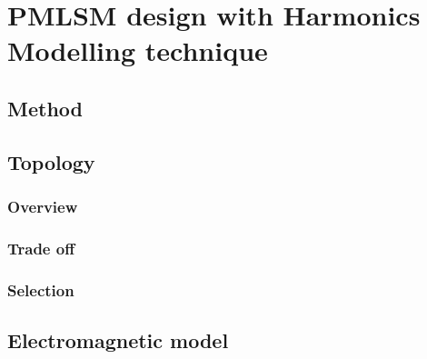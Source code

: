 \chapter{PMLSM design with Harmonics Modelling technique}   \label{Chapter:PMLSM design HM}


\section{Method}                                \label{Chapter:PMLSM design HM/method}


\section{Topology}                              \label{Chapter:PMLSM design HM/topology}
    \subsection{Overview}                       \label{Chapter:PMLSM design HM/topology/overview}
    \subsection{Trade off}                      \label{Chapter:PMLSM design HM/topology/trade off}
    \subsection{Selection}                      \label{Chapter:PMLSM design HM/topology/selection}


\section{Electromagnetic model}                 \label{Chapter:PMLSM design HM/electromagnetic model}
